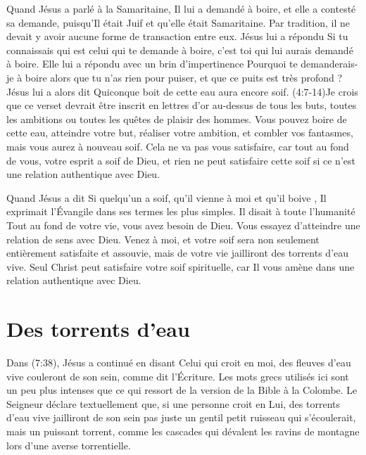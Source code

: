 Quand Jésus a parlé à la Samaritaine, Il lui a demandé à boire,
 et elle a contesté sa demande, puisqu'Il était Juif
 et qu'elle était Samaritaine. Par tradition, il ne devait y avoir
 aucune forme de transaction entre eux. Jésus lui a répondu\frcolon{}
 \Og Si tu connaissais qui est celui qui te demande à boire,
 c'est toi qui lui aurais demandé à boire. \Fg{}
 Elle lui a répondu avec un brin d'impertinence\frcolon{}
 \Og Pourquoi te demanderais-je à boire alors que tu n'as rien pour puiser,
 et que ce puits est très profond ? \Fg{} Jésus lui a alors dit\frcolon{}
 \Og Quiconque boit de cette eau aura encore soif. \Fg{}
 (4:7-14)Je crois que ce verset devrait être inscrit
 en lettres d'or au-dessus de tous les buts, toutes les
 ambitions ou toutes les quêtes de plaisir des hommes.
 Vous pouvez boire de cette eau, atteindre votre but, réaliser votre ambition,
 et combler vos fantasmes, mais vous aurez à nouveau soif.
 Cela ne va pas vous satisfaire, car tout au fond de vous,
 votre esprit a soif de Dieu, et rien ne peut satisfaire cette soif
 si ce n'est une relation authentique avec Dieu.

Quand Jésus a dit\frcolon{} \Og Si quelqu'un a soif, qu'il vienne à moi
 et qu'il boive \Fg{}, Il exprimait l'Évangile dans ses termes
 les plus simples. Il disait à toute l'humanité\frcolon{}
 \Og Tout au fond de votre vie, vous avez besoin de Dieu.
 Vous essayez d'atteindre une relation de sens avec Dieu.
 Venez à moi, et votre soif sera non seulement entièrement satisfaite
 et assouvie, mais de votre vie jailliront des torrents d'eau vive. \Fg{}
 Seul Christ peut satisfaire votre soif spirituelle,
 car Il vous amène dans une relation authentique avec Dieu.


\section{Des torrents d'eau}

Dans (7:38), Jésus a continué en disant\frcolon{}
 \Og Celui qui croit en moi, des fleuves d'eau vive couleront de son sein,
 comme dit l'Écriture. \Fg{}
 Les mots grecs utilisés ici sont un peu plus intenses que ce qui ressort
 de la version de la Bible à la Colombe. Le Seigneur déclare textuellement
 que, si une personne croit en Lui, \Og des torrents d'eau vive jailliront
 de son sein \Fg{} \ocadr pas juste un gentil petit ruisseau qui s'écoulerait,
 mais un puissant torrent, comme les cascades qui dévalent les ravins de montagne
 lors d'une averse torrentielle.

